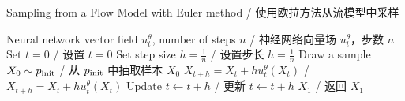 \begin{algorithm}[h]
\caption{Sampling from a Flow Model with Euler method / 使用欧拉方法从流模型中采样}
\label{alg:sampling_flow_model}
\begin{algorithmic}[1]
\REQUIRE Neural network vector field $u_t^\theta$, number of steps $n$ / 神经网络向量场 $u_t^\theta$，步数 $n$
\STATE Set $t=0$ / 设置 $t=0$
\STATE Set step size $h=\frac{1}{n}$ / 设置步长 $h=\frac{1}{n}$
\STATE Draw a sample $X_0\sim p_{\rm{init}}$ / 从 $p_{\rm{init}}$ 中抽取样本 $X_0$
    \STATE $X_{t+h} = X_{t} + h u_t^\theta(X_t)$ / $X_{t+h} = X_{t} + h u_t^\theta(X_t)$
    \STATE Update $t\leftarrow t+h$ / 更新 $t\leftarrow t+h$
\ENDFOR
\RETURN $X_1$ / 返回 $X_1$
\end{algorithmic}
\end{algorithm}




